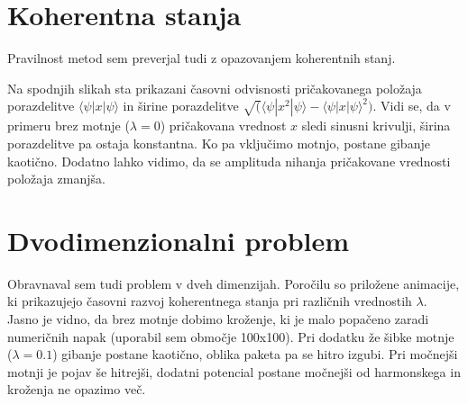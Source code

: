 \documentclass[a4paper,10pt]{article}
\begin{document}
\section{Koherentna stanja}

Pravilnost metod sem preverjal tudi z opazovanjem koherentnih stanj. 

Na spodnjih slikah sta prikazani časovni odvisnosti pričakovanega položaja porazdelitve $\langle\psi|x|\psi\rangle$ in 
širine porazdelitve $\sqrt(\langle\psi|x^{2}|\psi\rangle - \langle\psi|x|\psi\rangle^{2})$. 
Vidi se, da v primeru brez motnje ($\lambda=0$) pričakovana vrednost $x$ sledi sinusni krivulji, širina porazdelitve pa ostaja konstantna.
Ko pa vključimo motnjo, postane gibanje kaotično. 
Dodatno lahko vidimo, da se amplituda nihanja pričakovane vrednosti položaja zmanjša. 




\section{Dvodimenzionalni problem}

Obravnaval sem tudi problem v dveh dimenzijah. 
Poročilu so priložene animacije, ki prikazujejo časovni razvoj koherentnega stanja pri različnih vrednostih $\lambda$. 
Jasno je vidno, da brez motnje dobimo kroženje, ki je malo popačeno zaradi numeričnih napak (uporabil sem območje 100x100). 
Pri dodatku že šibke motnje ($\lambda=0.1$) gibanje postane kaotično, oblika paketa pa se hitro izgubi. 
Pri močnejši motnji je pojav še hitrejši, dodatni potencial postane močnejši od harmonskega in kroženja ne opazimo več. 
\end{document}
